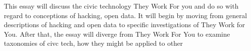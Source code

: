 This essay will discuss the civic technology They Work For you and do so with regard to conceptions of hacking, open data. It will begin by moving from general descriptions of hacking and open data to specific investigations of They Work for You. 			After that, the essay will diverge from They Work For You to examine taxonomies of civc tech, how they might be applied to 		other 
